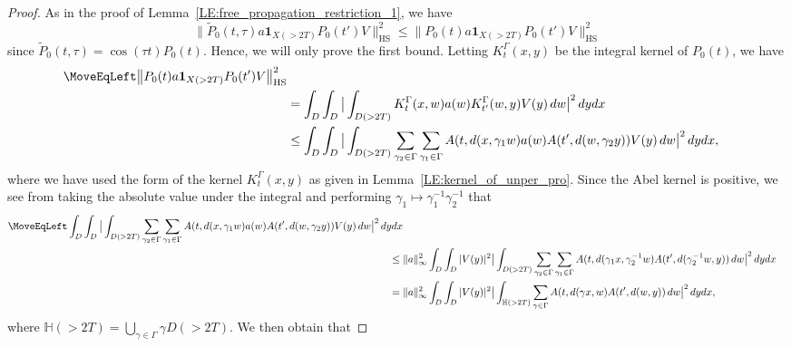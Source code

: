 \documentclass[11pt,twoside,reqno]{amsart}
\newcommand{\bH}{\mathbb{H}}
\newcommand{\1}{\mathrm{\mathbf{1}}}
\newcommand{\bHS}{\mathrm{HS}}
\numberwithin{equation}{section}
\theoremstyle{plain}
\theoremstyle{definition}
\theoremstyle{remark}
\begin{document}
\begin{proof}
As in the proof of Lemma~\ref{LE:free_propagation_restriction_1}, we have 
\begin{equation*}
     \big\lVert  \widetilde{P}_0(t,\tau) a \boldsymbol{1}_{X( > 2T)} P_0(t') V  \big\rVert_{\bHS}^2 \leq  \big\lVert  P_0(t) a \boldsymbol{1}_{X( > 2T)} P_0(t') V  \big\rVert_{\bHS}^2
\end{equation*}
since $\widetilde{P}_0(t,\tau) = \cos(\tau t) P_0(t)$. Hence, we will only prove the first bound.
Letting $K_{t}^\Gamma(x,y)$ be the integral kernel of $P_0(t)$, we have
\begin{equation}\label{Eq:K_Gamma_1}
    \begin{aligned}
    \MoveEqLeft \big\lVert  P_0(t) a \boldsymbol{1}_{X( > 2T)} P_0(t') V  \big\rVert_{\bHS}^2 
    \\
    &= \int_D \int_D \big| \int_{D( > 2T)} K_t^\Gamma(x,w) a(w) K_{t'}^\Gamma(w,y)V(y) \, d w  \big|^2 \, d yd x
    \\
    &\leq \int_D \int_D \big| \int_{D( > 2T)} \sum_{ \gamma_2 \in \Gamma} \sum_{\gamma_1 \in \Gamma } A(t, d(x, \gamma_1 w) a(w) A(t', d( w, \gamma_2 y ))V(y) \, d w  \big|^2 \, d yd x,
    \end{aligned}
\end{equation}
where we have used the form of the kernel $K^\Gamma_{t}(x,y)$ as given in Lemma~\ref{LE:kernel_of_unper_pro}.  
Since the Abel kernel is positive, we see from taking the absolute value under the integral and performing  $ \gamma_1 \mapsto \gamma_1^{-1} \gamma_2^{-1} $ that  
\begin{equation}\label{Eq:K_Gamma_2}
    \begin{aligned}
    \MoveEqLeft \int_D \int_D \big| \int_{D( > 2T)} \sum_{ \gamma_2 \in \Gamma} \sum_{\gamma_1 \in \Gamma } A(t, d(x, \gamma_1 w) a(w) A(t', d( w, \gamma_2 y ))V(y) \, d w  \big|^2 \, d yd x
    \\
    \leq{}& \lVert a\rVert_\infty^2 \int_D \int_D |V(y) |^2 \big| \int_{D( > 2T)} \sum_{ \gamma_2 \in \Gamma} \sum_{\gamma_1 \in \Gamma } A(t, d( \gamma_1 x, \gamma_2^{-1} w) A(t', d( \gamma_2^{-1} w, y )) \, d w  \big|^2 \, d yd x
    \\
    ={}&\lVert a\rVert_\infty^2 \int_D \int_D |V(y) |^2 \big| \int_{\mathbb{H}( > 2T)} \sum_{\gamma \in \Gamma } A(t, d( \gamma x, w) A(t', d( w, y )) \, d w  \big|^2 \, d yd x,
    \end{aligned}
\end{equation}
where $ \bH(>2T) = \bigcup_{\gamma \in \Gamma} \gamma D(>2T) $. We then obtain that 

\end{proof}
\end{document}
